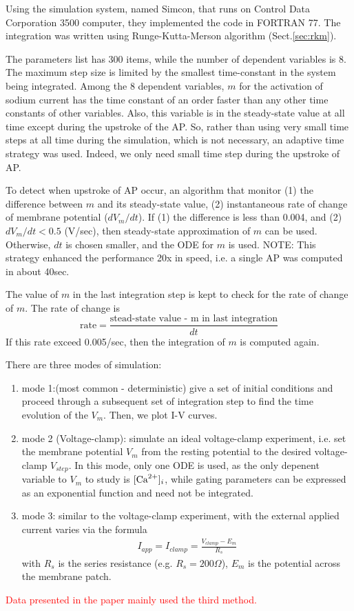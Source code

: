 Using the simulation system, named Simcon, that runs on Control Data Corporation
3500 computer, they implemented the code in FORTRAN 77. The integration was
written using Runge-Kutta-Merson algorithm (Sect.\ref{sec:rkm}). 

The parameters list has 300 items, while the number of dependent variables is 8.
The maximum step size is limited by the smallest time-constant in the system
being integrated. Among the 8 dependent variables, $m$ for the activation of
sodium current has the time constant of an order faster than any other time
constants of other variables. Also, this variable is in the steady-state value
at all time except during the upstroke of the AP. So, rather than using very
small time steps at all time during the simulation, which is not necessary, an
adaptive time strategy was used. Indeed, we only need small time step during the
upstroke of AP.

To detect when upstroke of AP occur, an algorithm that monitor (1) the
difference between $m$ and its steady-state value, (2) instantaneous rate of
change of membrane potential ($dV_m/dt$). If (1) the difference is less than
0.004, and (2) $dV_m/dt < 0.5$ (V/sec), then steady-state approximation of $m$
can be used. Otherwise, $dt$ is chosen smaller, and the ODE for $m$ is used.
NOTE: This strategy enhanced the performance 20x in speed, i.e. a single AP was
computed in about 40sec.

The value of $m$ in the last integration step is kept to check for the
rate of change of $m$. The rate of change is
\begin{equation}
  \label{eq:574}
  \text{rate} = \frac{\text{stead-state value - m in last integration}}{dt}
\end{equation}
If this rate exceed 0.005/sec, then the integration of  $m$ is
computed again. 

There are three modes of simulation:
\begin{enumerate}
\item mode 1:(most common - deterministic) give a set of initial
  conditions and proceed through a subsequent set of integration step
  to find the time evolution of the $V_m$. Then, we plot I-V
  curves. 

\item mode 2 (Voltage-clamp): simulate an ideal voltage-clamp experiment, i.e.
set the membrane potential $V_m$ from the resting potential to the desired
voltage-clamp $V_{step}$. In this mode, only one ODE is used, as the only
depenent variable to $V_m$ to study is $[{\text{Ca}^{2+}} ]_i$, while gating parameters can
be expressed as an exponential function and need not be integrated.

\item mode 3: similar to the voltage-clamp experiment, with the
  external applied current varies via the formula
  \begin{eqnarray}
    \label{eq:401}
    I_{app} = I_{clamp} = \frac{V_{clamp} - E_m}{R_s}
  \end{eqnarray}
  with $R_s$ is the series resistance (e.g. $R_s = 200\Omega$), $E_m$ is the
  potential across the membrane patch. 
\end{enumerate}
\textcolor{red}{Data presented in the paper mainly used the third method.}


